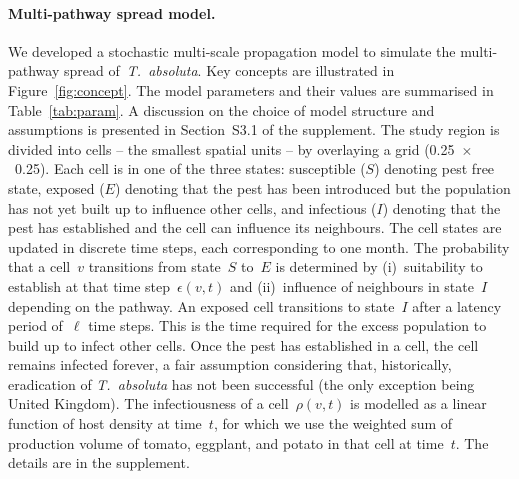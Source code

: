 \documentclass[11pt]{article}
\newcommand{\tuta}{\emph{T.~absoluta}}
\newcommand{\infest}{\rho}
\newcommand{\suitable}{\epsilon}
\theoremstyle{definition}
\begin{document}
\paragraph{Multi-pathway spread model.} We developed a stochastic
multi-scale propagation model to simulate the multi-pathway spread
of~\tuta{}. Key concepts are illustrated in Figure~\ref{fig:concept}. The
model parameters and their values are summarised in Table~\ref{tab:param}.
A discussion on the choice of model structure and assumptions is presented
in Section~S3.1 of the supplement. The study region
is divided into cells -- the smallest spatial units -- by overlaying a grid
(0.25\textdegree~$\times$~0.25\textdegree). Each cell is in one of the
three states: susceptible ($S$) denoting pest free state, exposed ($E$)
denoting that the pest has been introduced but the population has not yet
built up to influence other cells, and infectious ($I$) denoting that the
pest has established and the cell can influence its neighbours. The cell
states are updated in discrete time steps, each corresponding to one month.
The probability that a cell~$v$ transitions from state~$S$ to~$E$ is
determined by (i)~suitability to establish at that time
step~$\suitable(v,t)$ and (ii)~influence of neighbours in state~$I$
depending on the pathway. An exposed cell transitions to state~$I$ after a
latency period of~$\ell$ time steps. This is the time required for the
excess population to build up to infect other cells. Once the pest has
established in a cell, the cell remains infected forever, a fair assumption
considering that, historically, eradication of \tuta{} has not been
successful (the only exception being United Kingdom). The infectiousness of
a cell~$\infest(v,t)$ is modelled as a linear function of host density at
time~$t$, for which we use the weighted sum of production volume of tomato,
eggplant, and potato in that cell at time~$t$. The details are in the
supplement.
\end{document}
